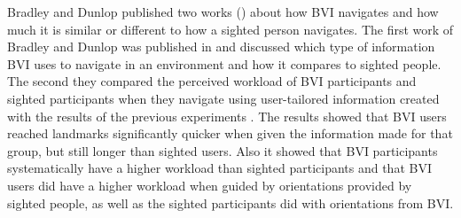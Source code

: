 Bradley and Dunlop published two works (\citeyear{bradley2002investigating,bradley2005experimental}) about how BVI navigates and how much it is similar or different to how a sighted person navigates. The first work of Bradley and Dunlop was published in \citeyear{bradley2002investigating} and discussed which type of information BVI uses to navigate in an environment and how it compares to sighted people. The second they compared the perceived workload of BVI participants and sighted participants when they navigate using user-tailored information created with the results of the previous experiments \cite{bradley2005experimental}. The results showed that BVI users reached landmarks significantly quicker when given the information made for that group, but still longer than sighted users. Also it showed that BVI participants systematically have a higher workload than sighted participants and that BVI users did have a higher workload when guided by orientations provided by sighted people, as well as the sighted participants did with orientations from BVI.